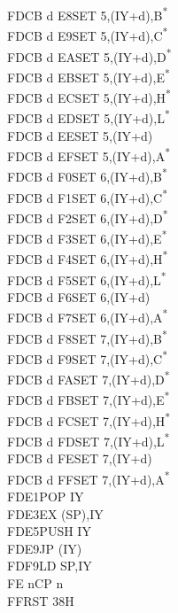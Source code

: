 \documentclass[twoside,openright,a4paper]{book}
\begin{document}
\begin{multicols}{3}
{\begin{tabbing}
	FDCB d E8\>SET 5,(IY+d),B\textsuperscript{*}\\
	FDCB d E9\>SET 5,(IY+d),C\textsuperscript{*}\\
	FDCB d EA\>SET 5,(IY+d),D\textsuperscript{*}\\
	FDCB d EB\>SET 5,(IY+d),E\textsuperscript{*}\\
	FDCB d EC\>SET 5,(IY+d),H\textsuperscript{*}\\
	FDCB d ED\>SET 5,(IY+d),L\textsuperscript{*}\\
	FDCB d EE\>SET 5,(IY+d)\\
	FDCB d EF\>SET 5,(IY+d),A\textsuperscript{*}\\
	FDCB d F0\>SET 6,(IY+d),B\textsuperscript{*}\\
	FDCB d F1\>SET 6,(IY+d),C\textsuperscript{*}\\
	FDCB d F2\>SET 6,(IY+d),D\textsuperscript{*}\\
	FDCB d F3\>SET 6,(IY+d),E\textsuperscript{*}\\
	FDCB d F4\>SET 6,(IY+d),H\textsuperscript{*}\\
	FDCB d F5\>SET 6,(IY+d),L\textsuperscript{*}\\
	FDCB d F6\>SET 6,(IY+d)\\
	FDCB d F7\>SET 6,(IY+d),A\textsuperscript{*}\\
	FDCB d F8\>SET 7,(IY+d),B\textsuperscript{*}\\
	FDCB d F9\>SET 7,(IY+d),C\textsuperscript{*}\\
	FDCB d FA\>SET 7,(IY+d),D\textsuperscript{*}\\
	FDCB d FB\>SET 7,(IY+d),E\textsuperscript{*}\\
	FDCB d FC\>SET 7,(IY+d),H\textsuperscript{*}\\
	FDCB d FD\>SET 7,(IY+d),L\textsuperscript{*}\\
	FDCB d FE\>SET 7,(IY+d)\\
	FDCB d FF\>SET 7,(IY+d),A\textsuperscript{*}\\
	FDE1\>POP IY\\
	FDE3\>EX (SP),IY\\
	FDE5\>PUSH IY\\
	FDE9\>JP (IY)\\
	FDF9\>LD SP,IY\\
	FE n\>CP n\\
	FF\>RST 38H
\end{tabbing}
}
\end{multicols}
\normalsize
\end{document}
